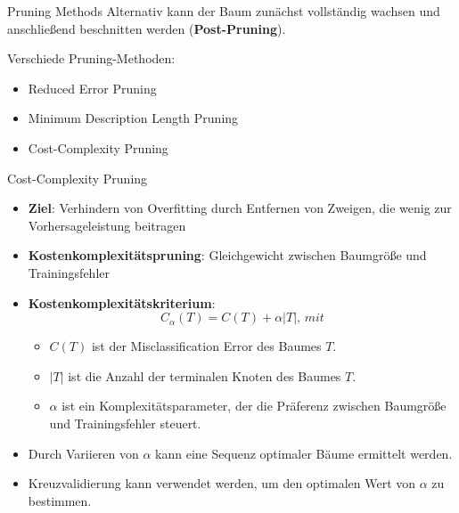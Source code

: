 \documentclass{beamer}
\begin{document}
\begin{frame}{Pruning Methods}
Alternativ kann der Baum zunächst vollständig wachsen und anschließend beschnitten werden (\textbf{Post-Pruning}).
 \begin{alertblock}{Verschiede Pruning-Methoden:}
\begin{itemize}
\item Reduced Error Pruning
\item Minimum Description Length Pruning
\item Cost-Complexity Pruning

\end{itemize}

\end{alertblock}
\end{frame}

\begin{frame}{Cost-Complexity Pruning}
	\begin{itemize}
		\item {\textbf{Ziel}: Verhindern von Overfitting durch Entfernen von Zweigen, die wenig zur Vorhersageleistung beitragen}
		\item {\textbf{Kostenkomplexitätspruning}: Gleichgewicht zwischen Baumgröße und Trainingsfehler}
		\item \textbf{Kostenkomplexitätskriterium}: \[C_{\alpha}(T) = C(T) + \alpha|T|, \, mit\]
		\begin{itemize}
			\item $C(T)$ ist der Misclassification Error des Baumes $T$.
			\item $|T|$ ist die Anzahl der terminalen Knoten des Baumes $T$.
			\item $\alpha$ ist ein Komplexitätsparameter, der die Präferenz zwischen Baumgröße und Trainingsfehler steuert.
		\end{itemize}
		\item Durch Variieren von $\alpha$ kann eine Sequenz optimaler Bäume ermittelt werden.
		\item Kreuzvalidierung kann verwendet werden, um den optimalen Wert von $\alpha$ zu bestimmen.
	\end{itemize}
\end{frame}





\end{document}
